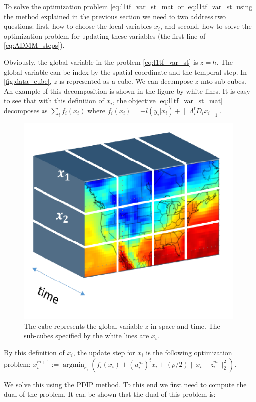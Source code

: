 \documentclass{article}
\DeclareMathOperator*{\argmin}{argmin}
\begin{document}
To solve the optimization problem \eqref{eq:l1tf_var_st_mat} or \eqref{eq:l1tf_var_st} using the method explained in the previous section we need to two address two questions: first, how to choose the local variables $x_i$, and second, how to solve the optimization problem for updating these variables (the first line of \eqref{eq:ADMM_steps}). 

Obviously, the global variable in the problem \eqref{eq:l1tf_var_st} is $z=h$. The global variable can be index by the spatial coordinate and the temporal step. In \autoref{fig:data_cube}, $z$ is represented as a cube. We can decompose $z$ into sub-cubes. An example of this decomposition is shown in the figure by white lines. It is easy to see that with this definition of $x_i$, the objective \eqref{eq:l1tf_var_st_mat} decomposes as $\sum_i f_i(x_i)$ where $f_i(x_i)=-l(y_i|x_i)+\lVert \Lambda_i^t D_ix_i \lVert_1$. 


\begin{figure}[ht]
	\vskip 0.2in
	\begin{center}
		\centerline{\includegraphics[width=.5\columnwidth]{Figures/data_cube}}
		\caption{The cube represents the global variable $z$ in space and time. The sub-cubes specified by the white lines are $x_i$.}
		\label{fig:data_cube}
	\end{center}
	\vskip -0.2in
\end{figure} 

By this definition of $x_i$, the update step for $x_i$ is the following optimization problem: $x_i^{m+1}:=\argmin_{x_i} ( f_i(x_i) + (u_i^m)^t x_i + (\rho/2) \lVert x_i-\tilde{z}_i^m \lVert_2^2)$.

We solve this using the PDIP method. To this end we first need to compute the dual of the problem. It can be shown that the dual of this problem is:

\end{document}
